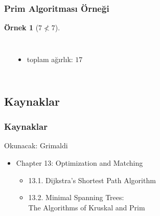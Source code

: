 \documentclass[dvipsnames]{beamer}
\theoremstyle{definition}
\theoremstyle{example}
\newtheorem{ornek}[theorem]{Örnek}
\theoremstyle{plain}
\begin{document}
\begin{frame}
  \frametitle{Prim Algoritması Örneği}

  \begin{ornek}[$7 \nless 7$]
    \begin{columns}
      \begin{center}
      \end{center}

      \begin{itemize}
        \item toplam ağırlık: $17$
      \end{itemize}
    \end{columns}
  \end{ornek}
\end{frame}

\subsection*{Kaynaklar}

\begin{frame}
  \frametitle{Kaynaklar}

  \begin{block}{Okunacak: Grimaldi}
    \begin{itemize}
      \item Chapter 13: Optimization and Matching
      \begin{itemize}
        \item 13.1. \alert{Dijkstra's Shortest Path Algorithm}
        \item 13.2. \alert{Minimal Spanning Trees:\\
                           The Algorithms of Kruskal and Prim}
      \end{itemize}
    \end{itemize}
  \end{block}
\end{frame}
\end{document}
